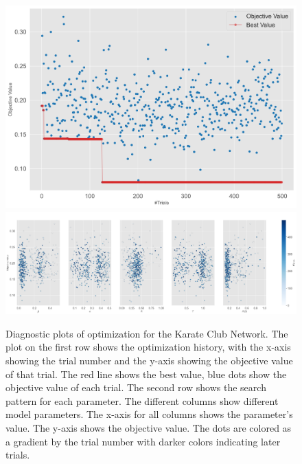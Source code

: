 \documentclass[11pt]{article}
\begin{document}
\begin{figure}[H]
    \centering
    \includegraphics[width=.7\linewidth]{../plots/overall/Optimization_History_karate.png}
    \includegraphics[width=.7\linewidth]{../plots/overall/Plot_Slice_karate.png}
  \caption{Diagnostic plots of optimization for the Karate Club Network. The plot on the first row shows the optimization history, with the x-axis showing the trial number and the y-axis showing the objective value of that trial. The red line shows the best value, blue dots show the objective value of each trial. The second row shows the search pattern for each parameter. The different columns show different model parameters. The x-axis for all columns shows the parameter's value. The y-axis shows the objective value. The dots are colored as a gradient by the trial number with darker colors indicating later trials.}
  \label{appendix:optimization_karate}
\end{figure}
\end{document}
